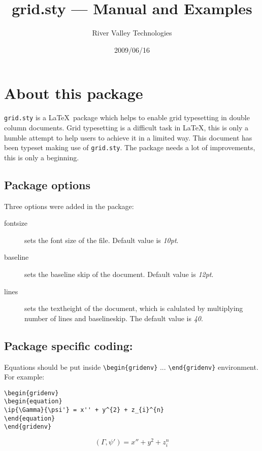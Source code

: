 \documentclass[twocolumn]{article}
\newcommand{\ip}[2]{(#1, #2)}
\begin{document}
\title{grid.sty --- Manual and Examples}
\author{River Valley Technologies}
\date{2009/06/16}


\maketitle

\section{About this package}

\texttt{grid.sty} is a \LaTeX\ package which helps to enable grid
typesetting in double column documents. Grid typesetting is a
difficult task in \LaTeX, this is only a humble attempt to help users
to achieve it in a limited way. This document has been typeset making
use of \verb+grid.sty+. The package needs a lot of improvements, this
is only a beginning.

\subsection{Package options}
Three options were added in the package:
\begin{description}
\item[fontsize] sets the font size of the file. Default value is
  \textit{10pt}.
\item[baseline] sets the baseline skip of the document. Default value
  is \textit{12pt}.
\item[lines] sets the textheight of the document, which is calulated
  by multiplying number of lines and baselineskip. The default value
  is \textit{40}.
\end{description}

\subsection{Package specific coding:}
Equations should be put inside \verb+\begin{gridenv}+ ...
  \verb+\end{gridenv}+ environment. For example:
\begin{gridenv}
{\footnotesize
\begin{verbatim}
\begin{gridenv}
\begin{equation}
\ip{\Gamma}{\psi'} = x'' + y^{2} + z_{i}^{n}
\end{equation}
\end{gridenv}
\end{verbatim}
}
\begin{equation}
\ip{\Gamma}{\psi'} = x'' + y^{2} + z_{i}^{n}\label{eq1}
\end{equation}
\end{gridenv}
\end{document}
